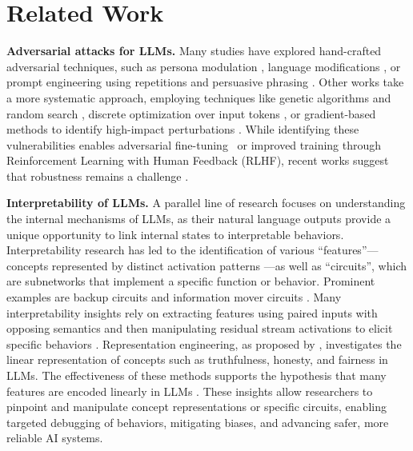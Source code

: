 \section{Related Work}
\textbf{Adversarial attacks for LLMs.} 
Many studies have explored hand-crafted adversarial techniques, such as persona modulation \cite{shah_scalable_2023}, language modifications \cite{zhu_autodan_2023}, or prompt engineering using repetitions and persuasive phrasing \cite{rao_tricking_2024}. Other works take a more systematic approach, employing techniques like genetic algorithms and random search \cite{chen_2024_eliciting}, discrete optimization over input tokens \cite{zou_universal_2023}, or gradient-based methods to identify high-impact perturbations \cite{geisler_attacking_2024}. 
While identifying these vulnerabilities enables adversarial fine-tuning~\cite{xhonneux2024efficient} or improved training through Reinforcement Learning with Human Feedback (RLHF), recent works suggest that robustness remains a challenge \cite{zou_representation_2023, schwinn2024soft, geisler_attacking_2024, scholten2025a}.

\textbf{Interpretability of LLMs.} A parallel line of research focuses on understanding the internal mechanisms of LLMs, as their natural language outputs provide a unique opportunity to link internal states to interpretable behaviors. Interpretability research has led to the identification of various ``features''---concepts represented by distinct activation patterns \cite{cunningham_sparse_2023}---as well as ``circuits'', which are subnetworks that implement a specific function or behavior. Prominent examples are backup circuits \cite{nanda2024Attribution} and information mover circuits \cite{wang_interpretability_2022}. Many interpretability insights rely on extracting features using paired inputs with opposing semantics \cite{burns2024discoveringlatentknowledgelanguage} and then manipulating residual stream activations to elicit specific behaviors \cite{panickssery_steering_2024}. 
Representation engineering, as proposed by \citet{zou_representation_2023}, investigates the linear representation of concepts such as truthfulness, honesty, and fairness in LLMs. The effectiveness of these methods supports the hypothesis that many features are encoded linearly in LLMs \cite{marks2024geometrytruthemergentlinear}. These insights allow researchers to pinpoint and manipulate concept representations or specific circuits, enabling targeted debugging of  behaviors, mitigating biases, and advancing safer, more reliable AI systems.

